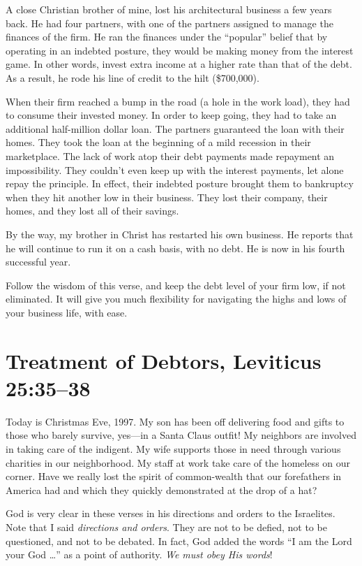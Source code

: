\documentclass[12pt]{memoir}
\begin{document}
A close Christian brother of mine, lost his architectural business
a few years back. He had four partners, with one of the partners assigned
to manage the finances of the firm. He ran the finances under the
``popular'' belief that by operating in an indebted posture, they
would be making money from the interest game. In other words, invest
extra income at a higher rate than that of the debt. As a result,
he rode his line of credit to the hilt (\$700,000). 

When their firm reached a bump in the road (a hole in the work load),
they had to consume their invested money. In order to keep going,
they had to take an additional half-million dollar loan. The partners
guaranteed the loan with their homes. They took the loan at the beginning
of a mild recession in their marketplace. The lack of work atop their
debt payments made repayment an impossibility. They couldn't even
keep up with the interest payments, let alone repay the principle.
In effect, their indebted posture brought them to bankruptcy when
they hit another low in their business. They lost their company, their
homes, and they lost all of their savings.

By the way, my brother in Christ has restarted his own business. He
reports that he will continue to run it on a cash basis, with no debt.
He is now in his fourth successful year. 

Follow the wisdom of this verse, and keep the debt level of your firm
low, if not eliminated. It will give you much flexibility for navigating
the highs and lows of your business life, with ease.

\section[Treatment of Debtors]{Treatment of Debtors, Leviticus 25:35--38}

Today is Christmas Eve, 1997. My son has been off delivering food and gifts to those who barely survive, yes---in a Santa Claus outfit! My neighbors are involved in taking care of the indigent.
My wife supports those in need through various charities in our neighborhood.
My staff at work take care of the homeless on our corner. Have
we really lost the spirit of common-wealth that our forefathers
in America had and which they quickly demonstrated at the drop of
a hat?

God is very clear in these verses in his directions and orders to the
Israelites. Note that I said \emph{directions and orders}. They are not to
be defied, not to be questioned, and not to be debated. In fact, God
added the words ``I am the Lord your God \dots'' as a point of authority. \emph{We must obey His words}!
\end{document}
